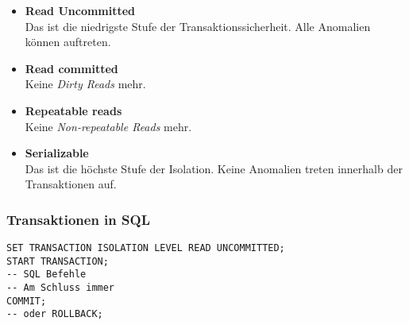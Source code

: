 \begin{itemize}
  \item \textbf{Read Uncommitted} \\
  Das ist die niedrigste Stufe der Transaktionssicherheit.  Alle Anomalien können auftreten.
  \item \textbf{Read committed} \\
  Keine \emph{Dirty Reads} mehr. 
  \item \textbf{Repeatable reads} \\
  Keine \emph{Non-repeatable Reads} mehr. 
  \item \textbf{Serializable} \\
  Das ist die höchste Stufe der Isolation. Keine Anomalien treten innerhalb der Transaktionen auf.
\end{itemize}

\subsubsection{Transaktionen in SQL}

\begin{lstlisting}[caption={Transaktionen in SQL}]
SET TRANSACTION ISOLATION LEVEL READ UNCOMMITTED;
START TRANSACTION;
-- SQL Befehle
-- Am Schluss immer
COMMIT;
-- oder ROLLBACK;
\end{lstlisting}
